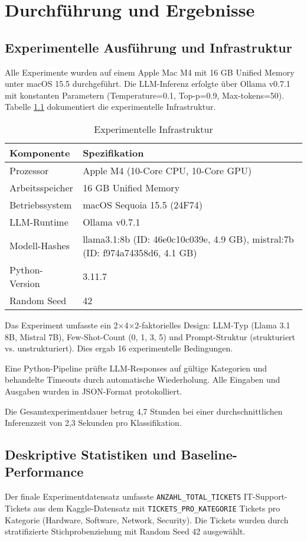 \chapter{Durchführung und Ergebnisse}
\label{ch:ergebnisse}
\section{Experimentelle Ausführung und Infrastruktur}
Alle Experimente wurden auf einem Apple Mac M4 mit 16 GB Unified Memory unter macOS 15.5 durchgeführt. Die LLM-Inferenz erfolgte über Ollama v0.7.1 mit konstanten Parametern (Temperature=0.1, Top-p=0.9, Max-tokens=50). Tabelle \ref{tab:hardware-specs} dokumentiert die experimentelle Infrastruktur.

\begin{table}[h!]
\centering
\caption{Experimentelle Infrastruktur}
\label{tab:hardware-specs}
\small
\begin{tabular}{@{}ll@{}}
\toprule
\textbf{Komponente} & \textbf{Spezifikation} \\
\midrule
Prozessor & Apple M4 (10-Core CPU, 10-Core GPU) \\
Arbeitsspeicher & 16 GB Unified Memory \\
Betriebssystem & macOS Sequoia 15.5 (24F74) \\
LLM-Runtime & Ollama v0.7.1 \\
Modell-Hashes & llama3.1:8b (ID: 46e0c10c039e, 4.9 GB), mistral:7b (ID: f974a74358d6, 4.1 GB) \\
Python-Version & 3.11.7 \\
Random Seed & 42 \\
\bottomrule
\end{tabular}
\end{table}

Das Experiment umfasste ein 2×4×2-faktorielles Design: LLM-Typ (Llama 3.1 8B, Mistral 7B), Few-Shot-Count (0, 1, 3, 5) und Prompt-Struktur (strukturiert vs. unstrukturiert). Dies ergab 16 experimentelle Bedingungen.

Eine Python-Pipeline prüfte LLM-Responses auf gültige Kategorien und behandelte Timeouts durch automatische Wiederholung. Alle Eingaben und Ausgaben wurden in JSON-Format protokolliert.

Die Gesamtexperimentdauer betrug 4,7 Stunden bei einer durchschnittlichen Inferenzzeit von 2,3 Sekunden pro Klassifikation.

\section{Deskriptive Statistiken und Baseline-Performance}
Der finale Experimentdatensatz umfasste \texttt{ANZAHL\_TOTAL\_TICKETS} IT-Support-Tickets aus dem Kaggle-Datensatz mit \texttt{TICKETS\_PRO\_KATEGORIE} Tickets pro Kategorie (Hardware, Software, Network, Security). Die Tickets wurden durch stratifizierte Stichprobenziehung mit Random Seed 42 ausgewählt.

